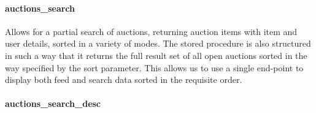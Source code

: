 \paragraph{auctions\_search}\label{auctionsux5fsearch}

Allows for a partial search of auctions, returning auction items with
item and user details, sorted in a variety of modes. The stored
procedure is also structured in such a way that it returns the full
result set of all open auctions sorted in the way specified by the sort
parameter. This allows us to use a single end-point to display both feed
and search data sorted in the requisite order.

\begin{Shaded}
\begin{Highlighting}[]
  \NormalTok{(}\NormalTok{), }  \NormalTok{(}\NormalTok{))}
     \NormalTok{*}
       
    
         \NormalTok{))}
         
      
       
                   
                   
                   
                   
        \NormalTok{;}

\end{Highlighting}
\end{Shaded}

\paragraph{auctions\_search\_desc}\label{auctionsux5fsearchux5fdesc}


